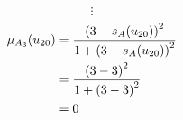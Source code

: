 \documentclass[a4paper]{book}
\begin{document}
				\[
					\vdots
				\]
				\begin{align}
					\mu_{A_3}(u_{20}) &= \frac{\left(3-s_A(u_{20})\right)^2}{1 + \left(3-s_A(u_{20})\right)^2}\\
					&= \frac{\left(3-3\right)^2}{1 + \left(3-3\right)^2} \notag \\
					&= 0 \notag
				\end{align}
\end{document}

